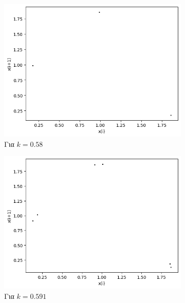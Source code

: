 \begin{figure}[ht]
\begin{subfigure}[c]{0.4\textwidth}
		\includegraphics[width=\textwidth]{LateX images/graphs q05/g9}
		\caption{Για $k=0.58$}
		\label{f:k33}
	\end{subfigure}
	\hfill
	\begin{subfigure}[c]{0.4\textwidth}
		\centering
		\includegraphics[width=\textwidth]{LateX images/graphs q05/g10}
		\caption{Για $k=0.591$}
		\label{f:k35}
	\end{subfigure}
	\hfill
	\centering
	\begin{subfigure}[b]{0.4\textwidth}
		\centering

\end{subfigure}
\end{figure}
